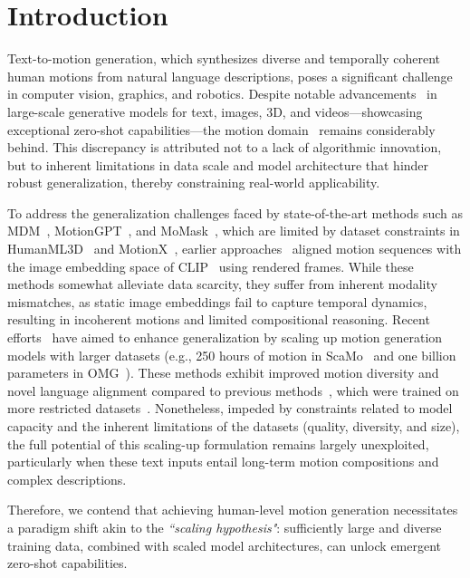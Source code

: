 \section{Introduction}
\label{sec:introduction}
Text-to-motion generation, which synthesizes diverse and temporally coherent human motions from natural language descriptions, poses a significant challenge in computer vision, graphics, and robotics. Despite notable advancements~\citep{rombach2022high,gpt3,gpt4, yang2025sigman, li2024dispose, chen2025dancetogether, sora, cheng2024learning, xu2023survey} in large-scale generative models for text, images, 3D, and videos—showcasing exceptional zero-shot capabilities—the motion domain~\citep{mdm,t2mgpt,zhou2023let,actformer,momask} remains considerably behind. This discrepancy is attributed not to a lack of algorithmic innovation, but to inherent limitations in data scale and model architecture that hinder robust generalization, thereby constraining real-world applicability.

To address the generalization challenges faced by state-of-the-art methods such as MDM~\citep{mdm}, MotionGPT~\citep{motiongpt}, and MoMask~\citep{momask}, which are limited by dataset constraints in HumanML3D~\citep{humanml3d} and MotionX~\citep{motionx}, earlier approaches~\citep{motionclip, avatarclip} aligned motion sequences with the image embedding space of CLIP~\citep{clip} using rendered frames. While these methods somewhat alleviate data scarcity, they suffer from inherent modality mismatches, as static image embeddings fail to capture temporal dynamics, resulting in incoherent motions and limited compositional reasoning. Recent efforts~\citep{lu2024scamo, xu2024motionbank, omg, wang2024quo} have aimed to enhance generalization by scaling up motion generation models with larger datasets (e.g., 250 hours of motion in ScaMo~\cite{lu2024scamo} and one billion parameters in OMG~\cite{omg}). These methods exhibit improved motion diversity and novel language alignment compared to previous methods~\cite{mdm, motiongpt, momask}, which were trained on more restricted datasets~\cite{humanml3d, motionx}. Nonetheless, impeded by constraints related to model capacity and the inherent limitations of the datasets (\eg quality, diversity, and size), the full potential of this scaling-up formulation remains largely unexploited, particularly when these text inputs entail long-term motion compositions and complex descriptions.

Therefore, we contend that achieving human-level motion generation necessitates a paradigm shift akin to the \emph{``scaling hypothesis"}: sufficiently large and diverse  training data, combined with scaled model architectures, can unlock emergent zero-shot capabilities. 

